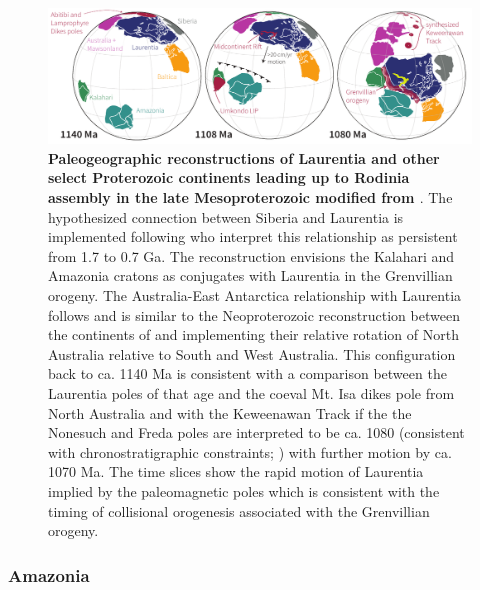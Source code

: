 \documentclass[twocolumn, switch]{article} %
\begin{document}
\begin{figure}
\centering
\includegraphics[width=\textwidth]{../Figures/Grenville_Reconstruction.pdf}
\caption{\textbf{Paleogeographic reconstructions of Laurentia and other select Proterozoic continents leading up to Rodinia assembly in the late Mesoproterozoic modified from \cite{Swanson-Hysell2019a}}. The hypothesized connection between Siberia and Laurentia is implemented following \cite{Evans2016b} who interpret this relationship as persistent from 1.7 to 0.7 Ga. The reconstruction envisions the Kalahari and Amazonia cratons as conjugates with Laurentia in the Grenvillian orogeny. The Australia-East Antarctica relationship with Laurentia follows \cite{Swanson-Hysell2012a} and is similar to the Neoproterozoic reconstruction between the continents of \cite{Li2011a} and implementing their relative rotation of North Australia relative to South and West Australia. This configuration back to ca. 1140 Ma is consistent with a comparison between the Laurentia poles of that age and the coeval Mt. Isa dikes pole from North Australia and with the Keweenawan Track if the the Nonesuch and Freda poles are interpreted to be ca. 1080 (consistent with chronostratigraphic constraints; \citealp{Slotznick2018a}) with further motion by ca. 1070 Ma. The time slices show the rapid motion of Laurentia implied by the paleomagnetic poles which is consistent with the timing of collisional orogenesis associated with the Grenvillian orogeny.}
\label{fig:Grenville_reconstructions}
\end{figure}

\subsubsection{Amazonia}
\end{document}

